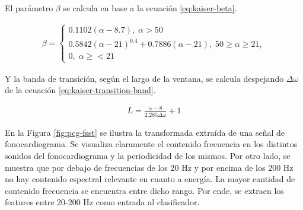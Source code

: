 \indent El parámetro $\beta$ se calcula en base a la ecuación \ref{eq:kaiser-beta}.

\begin{align} \label{eq:kaiser-beta}
  \beta = \begin{cases}
    0.1102(\alpha-8.7), \; \alpha > 50 \\
    0.5842(\alpha-21)^{0.4}+0.7886(\alpha-21), \; 50 \geq \alpha \geq 21, \\
    0, \; \alpha \geq < 21
  \end{cases}
\end{align}

Y la banda de transición, según el largo de la ventana, se calcula despejando $\Delta\omega$ de la ecuación
\ref{eq:kaiser-transition-band}.

\begin{align} \label{eq:kaiser-transition-band}
  L = \frac{\alpha-8}{2.285\Delta\omega} + 1
\end{align}

\indent En la Figura \ref{fig:pcg-fsst} se ilustra la transformada extraída de una señal de fonocardiograma. Se
visualiza claramente el contenido frecuencia en los distintos sonidos del fonocardiograma y la periodicidad de los
mismos. Por otro lado, se muestra que por debajo de frecuencias de los 20 Hz y por encima de los 200 Hz no hay
contenido espectral relevante en cuanto a energía. La mayor cantidad de contenido frecuencia se encuentra entre
dicho rango. Por ende, se extraen los features entre 20-200 Hz como entrada al clasificador.

